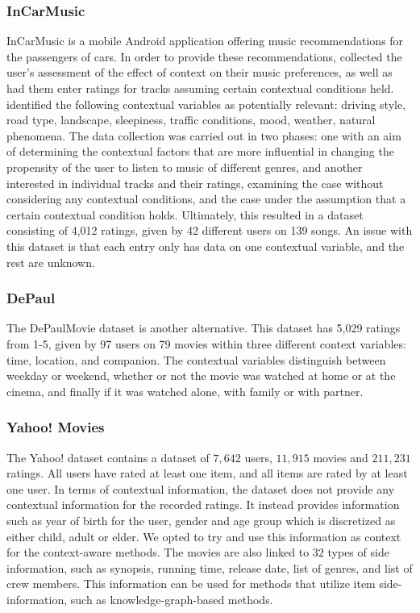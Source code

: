 \subsubsection{InCarMusic}
InCarMusic\cite{InCarMusic2011} is a mobile Android application offering music recommendations for the passengers of cars.
In order to provide these recommendations, \cite{InCarMusic2011} collected the user's assessment of the effect of context on their music preferences, as well as had them enter ratings for tracks assuming certain contextual conditions held.
\cite{InCarMusic2011} identified the following contextual variables as potentially relevant: driving style, road type, landscape, sleepiness, traffic conditions, mood, weather, natural phenomena.
The data collection was carried out in two phases: one with an aim of determining the contextual factors that are more influential in changing the propensity of the user to listen to music of different genres, and another interested in individual tracks and their ratings, examining the case without considering any contextual conditions, and the case under the assumption that a certain contextual condition holds.
Ultimately, this resulted in a dataset consisting of 4,012 ratings, given by 42 different users on 139 songs.
An issue with this dataset is that each entry only has data on one contextual variable, and the rest are unknown.

\subsubsection{DePaul}
The DePaulMovie\cite{DePaulData} dataset is another alternative.
This dataset has 5,029 ratings from 1-5, given by 97 users on 79 movies within three different context variables: time, location, and companion\cite{DePaulData}.
The contextual variables distinguish between weekday or weekend, whether or not the movie was watched at home or at the cinema, and finally if it was watched alone, with family or with partner.

\subsubsection{Yahoo! Movies}
The Yahoo! dataset\cite{yahoo-movie} contains a dataset of $7,642$ users, $11,915$ movies and $211,231$ ratings.
All users have rated at least one item, and all items are rated by at least one user.
In terms of contextual information, the dataset does not provide any contextual information for the recorded ratings.
It instead provides information such as year of birth for the user, gender and age group which is discretized as either child, adult or elder.
We opted to try and use this information as context for the context-aware methods.
The movies are also linked to $32$ types of side information, such as synopsis, running time, release date, list of genres, and list of crew members.
This information can be used for methods that utilize item side-information, such as knowledge-graph-based methods.

